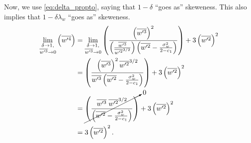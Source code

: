Now, we use \cref{eq:delta_propto}, saying that $1-\delta$ \enquote{goes as} skeweness.
This also implies that $1-\delta\lambda_w$ \enquote{goes as} skeweness.
\begin{align}
    \lim_{\substack{\delta \to 1, \\ \overline{w'^3} \to 0}}
    \left(\overline{w'^4}\right)
    &= \lim_{\substack{\delta \to 1, \\ \overline{w'^3} \to 0}}
    \left(
    \frac{
        \left(\overline{w'^3}\right)^2
    }{
        \left(\frac{\overline{w'^3}}{\overline{w'^2}^{3/2}}\right)
        \left(\overline{w'^2} - \frac{\sigma_w^2}{2 - c_1}\right)
    }
    \right)
    + 3 \left(\overline{w'^2}\right)^2
    \\
    &=
    \left(
    \frac{
        \left(\overline{w'^3}\right)^2
        \overline{w'^2}^{3/2}
    }{
        \overline{w'^3}
        \left(\overline{w'^2} - \frac{\sigma_w^2}{2 - c_1}\right)
    }
    \right)
    + 3 \left(\overline{w'^2}\right)^2
    \\
    &=
    \cancelto{0}{
        \left(
        \frac{
            \overline{w'^3}
            \;
            \overline{w'^2}^{3/2}
        }{
            \left(\overline{w'^2} - \frac{\sigma_w^2}{2 - c_1}\right)
        }
        \right)
    }
    + 3 \left(\overline{w'^2}\right)^2
    \\
    &= 3 \left(\overline{w'^2}\right)^2.
\end{align}


